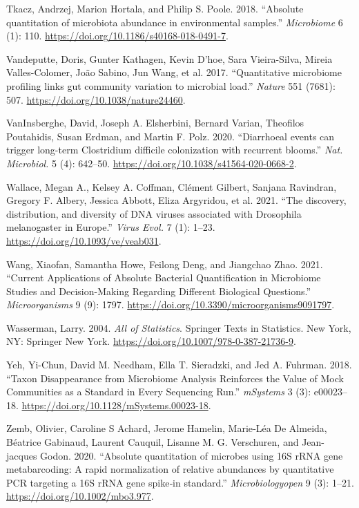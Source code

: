 \documentclass[
]{article}
\newlength{\cslhangindent}
\newlength{\cslentryspacingunit} %
\newenvironment{CSLReferences}[2] %
 {%
  \setlength{\parindent}{0pt}
  \ifodd #1
  \let\oldpar\par
  \def\par{\hangindent=\cslhangindent\oldpar}
  \fi
  \setlength{\parskip}{#2\cslentryspacingunit}
 }%
 {}
\begin{document}
\begin{CSLReferences}{1}{0}
\leavevmode{}%
Tkacz, Andrzej, Marion Hortala, and Philip S. Poole. 2018. {``{Absolute quantitation of microbiota abundance in environmental samples}.''} \emph{Microbiome} 6 (1): 110. \url{https://doi.org/10.1186/s40168-018-0491-7}.

\leavevmode{}%
Vandeputte, Doris, Gunter Kathagen, Kevin D'hoe, Sara Vieira-Silva, Mireia Valles-Colomer, João Sabino, Jun Wang, et al. 2017. {``{Quantitative microbiome profiling links gut community variation to microbial load}.''} \emph{Nature} 551 (7681): 507. \url{https://doi.org/10.1038/nature24460}.

\leavevmode{}%
VanInsberghe, David, Joseph A. Elsherbini, Bernard Varian, Theofilos Poutahidis, Susan Erdman, and Martin F. Polz. 2020. {``{Diarrhoeal events can trigger long-term Clostridium difficile colonization with recurrent blooms}.''} \emph{Nat. Microbiol.} 5 (4): 642--50. \url{https://doi.org/10.1038/s41564-020-0668-2}.

\leavevmode{}%
Wallace, Megan A., Kelsey A. Coffman, Clément Gilbert, Sanjana Ravindran, Gregory F. Albery, Jessica Abbott, Eliza Argyridou, et al. 2021. {``{The discovery, distribution, and diversity of DNA viruses associated with Drosophila melanogaster in Europe}.''} \emph{Virus Evol.} 7 (1): 1--23. \url{https://doi.org/10.1093/ve/veab031}.

\leavevmode{}%
Wang, Xiaofan, Samantha Howe, Feilong Deng, and Jiangchao Zhao. 2021. {``{Current Applications of Absolute Bacterial Quantification in Microbiome Studies and Decision-Making Regarding Different Biological Questions}.''} \emph{Microorganisms} 9 (9): 1797. \url{https://doi.org/10.3390/microorganisms9091797}.

\leavevmode{}%
Wasserman, Larry. 2004. \emph{{All of Statistics}}. Springer Texts in Statistics. New York, NY: Springer New York. \url{https://doi.org/10.1007/978-0-387-21736-9}.

\leavevmode{}%
Yeh, Yi-Chun, David M. Needham, Ella T. Sieradzki, and Jed A. Fuhrman. 2018. {``{Taxon Disappearance from Microbiome Analysis Reinforces the Value of Mock Communities as a Standard in Every Sequencing Run}.''} \emph{mSystems} 3 (3): e00023--18. \url{https://doi.org/10.1128/mSystems.00023-18}.

\leavevmode{}%
Zemb, Olivier, Caroline S Achard, Jerome Hamelin, Marie‐Léa De Almeida, Béatrice Gabinaud, Laurent Cauquil, Lisanne M. G. Verschuren, and Jean-jacques Godon. 2020. {``{Absolute quantitation of microbes using 16S rRNA gene metabarcoding: A rapid normalization of relative abundances by quantitative PCR targeting a 16S rRNA gene spike‐in standard}.''} \emph{Microbiologyopen} 9 (3): 1--21. \url{https://doi.org/10.1002/mbo3.977}.

\end{CSLReferences}
\end{document}
